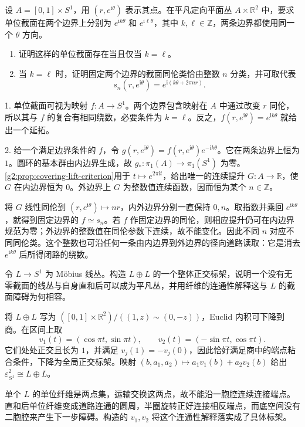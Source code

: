 \begin{exercise}\label{g2:ex:annulus-relative-unit-sections}
	设 \(A=[0,1]\times S^1\)，用 \((r,e^{\mathrm i\theta})\) 表示其点。在平凡定向平面丛 \(A\times\mathbb R^2\) 中，要求单位截面在两个边界上分别为 \(e^{\mathrm i k\theta}\) 和 \(e^{\mathrm i\ell\theta}\)，其中 \(k,\ell\in\mathbb Z\)，两条边界都使用同一个 \(\theta\) 方向。
	\begin{enumerate}
		\item 证明这样的单位截面存在当且仅当 \(k=\ell\)。
		\item 当 \(k=\ell\) 时，证明固定两个边界的截面同伦类恰由整数 \(n\) 分类，并可取代表
		\[
			s_n(r,e^{\mathrm i\theta})=e^{\mathrm i(k\theta+2\pi nr)}.
		\]
	\end{enumerate}
\end{exercise}
\begin{solution}
	1. 单位截面可视为映射 \(f:A\rightarrow S^1\)。两个边界包含映射在 \(A\) 中通过改变 \(r\) 同伦，所以其与 \(f\) 的复合有相同绕数，必要条件为 \(k=\ell\)。反之，\(f(r,e^{\mathrm i\theta})=e^{\mathrm i k\theta}\) 就给出一个延拓。

	2. 给一个满足边界条件的 \(f\)，令 \(g(r,e^{\mathrm i\theta})=f(r,e^{\mathrm i\theta})e^{-\mathrm i k\theta}\)。它在两条边界上恒为 \(1\)。圆环的基本群由内边界生成，故 \(g_*:\pi_1(A)\rightarrow\pi_1(S^1)\) 为零。\cref{g2:prop:covering-lift-criterion}用于 \(t\mapsto e^{2\pi\mathrm it}\)，给出唯一的连续提升 \(G:A\rightarrow\mathbb R\)，使 \(G\) 在内边界恒为 \(0\)。外边界上 \(G\) 为整数值连续函数，因而恒为某个 \(n\in\mathbb Z\)。

	将 \(G\) 线性同伦到 \((r,e^{\mathrm i\theta})\mapsto nr\)，内外边界分别一直保持 \(0,n\)。取指数并乘回 \(e^{\mathrm i k\theta}\)，就得到固定边界的 \(f\simeq s_n\)。若 \(f\) 作固定边界的同伦，则相应提升仍可在内边界规范为零；外边界的整数值在同伦参数下连续，故不能变化。因此不同 \(n\) 对应不同同伦类。这个整数也可沿任何一条由内边界到外边界的径向道路读取：它是消去 \(e^{\mathrm i k\theta}\) 后所得闭路的绕数。
\end{solution}

\begin{exercise}\label{g2:ex:double-mobius-frame}
	令 \(L\rightarrow S^1\) 为 Möbius 线丛。构造 \(L\oplus L\) 的一个整体正交标架，说明一个没有无零截面的线丛与自身直和后可以成为平凡丛，并用纤维的连通性解释这与 \(L\) 的截面障碍为何相容。
\end{exercise}
\begin{solution}
	将 \(L\oplus L\) 写为 \(([0,1]\times\mathbb R^2)/((1,z)\sim(0,-z))\)，Euclid 内积可下降到商。在区间上取
	\[
		v_1(t)=(\cos\pi t,\sin\pi t),\qquad v_2(t)=(-\sin\pi t,\cos\pi t).
	\]
	它们处处正交且长为 \(1\)，并满足 \(v_j(1)=-v_j(0)\)，因此恰好满足商中的端点粘合条件，下降为全局正交标架。映射 \((b,a_1,a_2)\mapsto a_1v_1(b)+a_2v_2(b)\) 给出 \(\varepsilon_{S^1}^2\cong L\oplus L\)。

	单个 \(L\) 的单位纤维是两点集，运输交换这两点，故不能沿一胞腔连续连接端点。直和后单位纤维变成道路连通的圆周，半圈旋转正好连接相反端点，而底空间没有二胞腔来产生下一步障碍。构造的 \(v_1,v_2\) 将这个连通性解释落实成了具体标架。
\end{solution}

